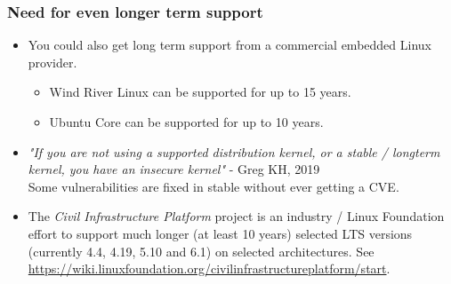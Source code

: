 \begin{frame}[fragile]
  \frametitle{Need for even longer term support}
  \begin{itemize}
  \item You could also get long term support from a commercial embedded
    Linux provider.
    \begin{itemize}
	\item Wind River Linux can be supported for up to 15 years.
	\item Ubuntu Core can be supported for up to 10 years.
    \end{itemize}
  \item {\em "If you are not using a supported distribution kernel, or a stable / longterm
    kernel, you have an insecure kernel"} - Greg KH, 2019\\
    Some vulnerabilities are fixed in stable without ever getting a CVE.
  \item The {\em Civil Infrastructure Platform} project is an industry /
    Linux Foundation effort to support much longer (at least 10 years)
    selected LTS versions (currently 4.4, 4.19, 5.10 and 6.1) on selected architectures.
    See \url{https://wiki.linuxfoundation.org/civilinfrastructureplatform/start}.
  \end{itemize}
\end{frame}

